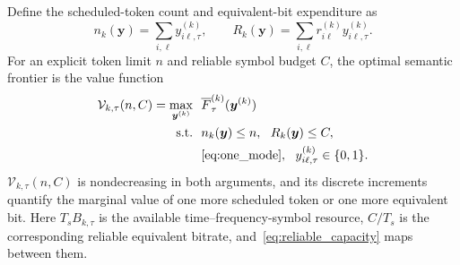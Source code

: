 \documentclass[journal]{IEEEtran}
\begin{document}
Define the scheduled-token count and equivalent-bit expenditure as
\begin{equation}
n_k(\bm y)=\sum_{i,\ell}y_{i\ell,\tau}^{(k)},
\qquad
R_k(\bm y)=\sum_{i,\ell}r_{i\ell}^{(k)}y_{i\ell,\tau}^{(k)}.
\label{eq:count_and_rate}
\end{equation}
For an explicit token limit $n$ and reliable symbol budget $C$, the optimal semantic frontier is the value function
\begin{equation}
\begin{split}
\mathcal V_{k,\tau}(n,C)
=\max_{\bm y^{(k)}}~~&\overline F_{\tau}^{(k)}(\bm y^{(k)})\\
\mathrm{s.t.}~~&n_k(\bm y)\leq n,~~R_k(\bm y)\leq C,\\
&\eqref{eq:one_mode},~~y_{i\ell,\tau}^{(k)}\in\{0,1\}.
\end{split}
\label{eq:semantic_rate_frontier}
\end{equation}
$\mathcal V_{k,\tau}(n,C)$ is nondecreasing in both arguments, and its discrete increments quantify the marginal value of one more scheduled token or one more equivalent bit. Here $T_sB_{k,\tau}$ is the available time--frequency-symbol resource, $C/T_s$ is the corresponding reliable equivalent bitrate, and~\eqref{eq:reliable_capacity} maps between them.
\end{document}
